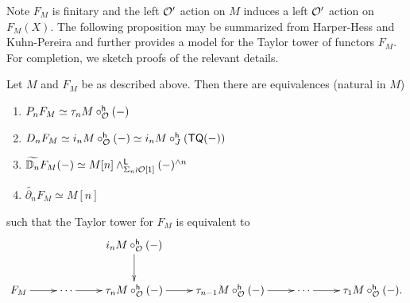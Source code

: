 Note $F_M$ is finitary and the left $\mathcal{O}'$ action on $M$ induces a left $\mathcal{O}'$ action on $F_M(X)$. The following proposition may be summarized from Harper-Hess \cite{Har-Hess} and Kuhn-Pereira \cite[]{KuhPer} and further provides a model for the Taylor tower of functors $F_M$. For completion, we sketch proofs of the relevant details. 

 
\begin{proposition} \label{prop:tay-tow-FM}
    Let $M$ and $F_M$ be as described above. Then there are equivalences (natural in $M$) \begin{enumerate}[label=(\roman*) ]
        \item $P_n F_M\simeq \tau_n M \circ^{\mathsf{h}}_{\mathcal{O}} (-)$
        
        \item $D_n F_M\simeq i_n M\circ^{\mathsf{h}}_{\mathcal{O}}(-) \simeq i_n M \circ^{\mathsf{h}}_J (\mathsf{TQ}(-))$ 
        
        \item $\widetilde{\mathbb{D}_n} F_M (-)\simeq M[n] \wedge^{\mathsf{L}}_{\Sigma_n \wr \mathcal{O}[1]} (-)^{\wedge n}$
        
        \item $\widetilde{\partial_n} F_M \simeq M[n]$
    \end{enumerate}
    such that the Taylor tower for $F_M$ is equivalent to \[\label{eq:taylor-tower-FM-AlgOO}
    \xymatrix{
    && i_n M \circ^{\mathsf{h}}_{\Cal{O}}(-) \ar[d] & & 
    \\
    F_M\ar[r] & 
    \cdots \ar[r] & 
    \tau_n M \circ^{\mathsf{h}}_{\Cal{O}} (-) \ar[r] & 
    \tau_{n-1} M\circ^{\mathsf{h}}_{\Cal{O}}(-) \ar[r] & \cdots \ar[r] & \tau_1M \circ^{\mathsf{h}}_{\Cal{O}}(-).
    }\]
\end{proposition}

